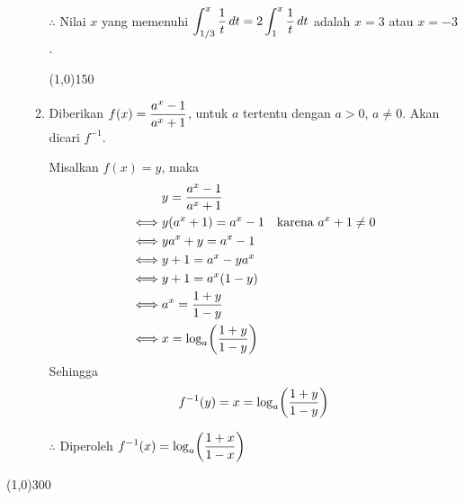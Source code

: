 \begin{enumerate}[leftmargin=*, label={\arabic*}.]
\begin{enumerate}[label={\alph*}.]
    $\therefore$ Nilai $x$ yang memenuhi 
    $\displaystyle\int_{1/3}^{x}\frac{1}{t}\,dt=2\int_{1}^{x}\frac{1}{t}\,dt$ adalah 
    $x=3$ atau $x=-3$.


\begin{center}\line(1,0){150}\end{center}


    \item Diberikan $\displaystyle f(x)=\frac{a^{x}-1}{a^{x}+1}$, untuk $a$ tertentu dengan $a > 0$, $a\neq 0$.
    Akan dicari $f^{-1}$.

    Misalkan $f(x)=y$, maka
    \begin{align*}
        &y = \frac{a^{x}-1}{a^{x}+1}\\
        \iff & y(a^{x}+1) = a^{x}-1
        &\text{karena }a^{x}+1\neq 0\\
        \iff & ya^{x}+y = a^{x}-1\\
        \iff & y+1 = a^{x}-ya^{x}\\
        \iff & y+1 = a^{x}(1-y)\\
        \iff & a^{x} = \frac{1+y}{1-y}\\
        \iff & x = \log_{a}\brk*{\frac{1+y}{1-y}}\\
    \end{align*}
    Sehingga 
    \[
    f^{-1}(y) = x = \log_{a}\brk*{\frac{1+y}{1-y}}
    \]

    $\therefore$ Diperoleh $\ds f^{-1}(x)=\log_{a}\brk*{\frac{1+x}{1-x}}$

    \end{enumerate}
\end{enumerate}

\begin{center}\line(1,0){300}\end{center}
